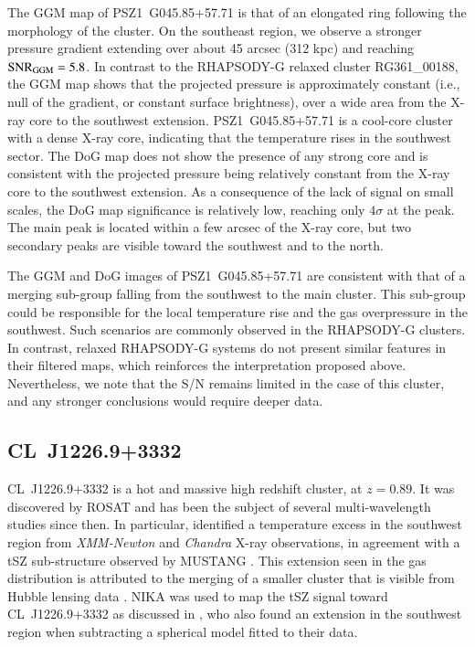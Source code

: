 \documentclass[traditabstract]{aa}
\begin{document}
The GGM map of \mbox{PSZ1~G045.85+57.71} is that of an elongated ring following the morphology of the cluster. On the southeast region, we observe a stronger pressure gradient extending over about 45 arcsec (312 kpc) and reaching ${\rm SNR}_{\rm GGM} = 5.8$. In contrast to the RHAPSODY-G relaxed cluster RG361\_00188, the GGM map shows that the projected pressure is approximately constant (i.e., null of the gradient, or constant surface brightness), over a wide area from the X-ray core to the southwest extension. \mbox{PSZ1~G045.85+57.71} is a cool-core cluster with a dense X-ray core, indicating that the temperature rises in the southwest sector. The DoG map does not show the presence of any strong core and is consistent with the projected pressure being relatively constant from the X-ray core to the southwest extension. As a consequence of the lack of signal on small scales, the DoG map significance is relatively low, reaching only $4 \sigma$ at the peak. The main peak is located within a few arcsec of the X-ray core, but two secondary peaks are visible toward the southwest and to the north.

The GGM and DoG images of \mbox{PSZ1~G045.85+57.71} are consistent with that of a merging sub-group falling from the southwest to the main cluster. This sub-group could be responsible for the local temperature rise and the gas overpressure in the southwest. Such scenarios are commonly observed in the RHAPSODY-G clusters. In contrast, relaxed RHAPSODY-G systems do not present similar features in their filtered maps, which reinforces the interpretation proposed above. Nevertheless, we note that the S/N remains limited in the case of this cluster, and any stronger conclusions would require deeper data.

\subsection{CL~J1226.9+3332}
\mbox{CL~J1226.9+3332} is a hot and massive high redshift cluster, at $z=0.89$. It was discovered by ROSAT \citep{Ebeling2001} and has been the subject of several multi-wavelength studies since then. In particular, \cite{Maughan2007} identified a temperature excess in the southwest region from \textit{XMM-Newton} and \textit{Chandra} X-ray observations, in agreement with a tSZ sub-structure observed by MUSTANG \citep{Korngut2011}. This extension seen in the gas distribution is attributed to the merging of a smaller cluster that is visible from Hubble lensing data \citep{Jee2009}. NIKA was used to map the tSZ signal toward \mbox{CL~J1226.9+3332} as discussed in \cite{Adam2015}, who also found an extension in the southwest region when subtracting a spherical model fitted to their data.
\end{document}
